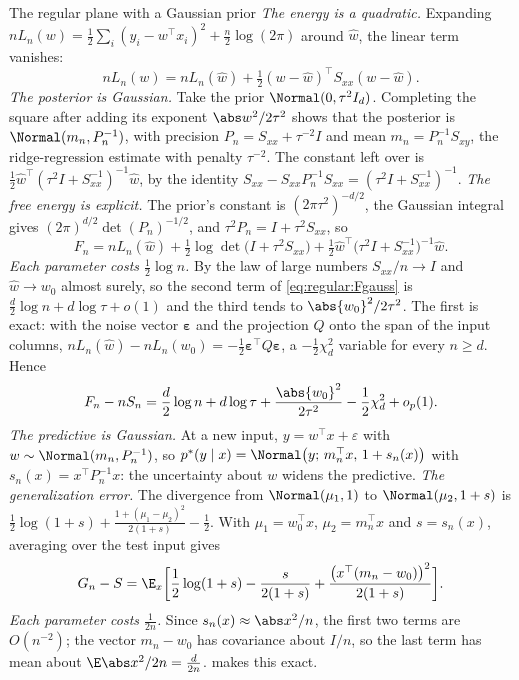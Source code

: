 \begin{refsection}
\begin{computation}{The regular plane with a Gaussian prior}\label{comp:regular:gauss}
\step \emph{The energy is a quadratic.} Expanding $nL_n(w)=\frac12\sum_i(y_i-w^\top x_i)^2+\frac n2\log(2\pi)$ around $\hat w$, the linear term vanishes:
\[
nL_n(w)=nL_n(\hat w)+\tfrac12(w-\hat w)^\top S_{xx}(w-\hat w).
\]
\step \emph{The posterior is Gaussian.} Take the prior $\Normal(0,\tau^2I_d)$. Completing the square after adding its exponent $\abs w^2/2\tau^2$ shows that the posterior is $\Normal(m_n,P_n^{-1})$, with precision $P_n=S_{xx}+\tau^{-2}I$ and mean $m_n=P_n^{-1}S_{xy}$, the ridge-regression estimate with penalty $\tau^{-2}$. The constant left over is $\frac12\hat w^\top(\tau^2I+S_{xx}^{-1})^{-1}\hat w$, by the identity $S_{xx}-S_{xx}P_n^{-1}S_{xx}=(\tau^2I+S_{xx}^{-1})^{-1}$.
\step \emph{The free energy is explicit.} The prior's constant is $(2\pi\tau^2)^{-d/2}$, the Gaussian integral gives $(2\pi)^{d/2}\det(P_n)^{-1/2}$, and $\tau^2P_n=I+\tau^2S_{xx}$, so
\begin{equation}\label{eq:regular:Fgauss}
F_n=nL_n(\hat w)+\tfrac12\log\det\bigl(I+\tau^2S_{xx}\bigr)+\tfrac12\hat w^\top\bigl(\tau^2I+S_{xx}^{-1}\bigr)^{-1}\hat w .
\end{equation}
\step \emph{Each parameter costs $\frac12\log n$.} By the law of large numbers $S_{xx}/n\to I$ and $\hat w\to w_0$ almost surely, so the second term of \eqref{eq:regular:Fgauss} is $\frac d2\log n+d\log\tau+o(1)$ and the third tends to $\abs{w_0}^2/2\tau^2$. The first is exact: with the noise vector $\boldsymbol\varepsilon$ and the projection $Q$ onto the span of the input columns, $nL_n(\hat w)-nL_n(w_0)=-\frac12\boldsymbol\varepsilon^\top Q\boldsymbol\varepsilon$, a $-\frac12\chi^2_d$ variable for every $n\ge d$. Hence
\[
F_n-nS_n=\frac d2\log n+d\log\tau+\frac{\abs{w_0}^2}{2\tau^2}-\frac12\chi^2_d+o_p(1).
\]
\step \emph{The predictive is Gaussian.} At a new input, $y=w^\top x+\varepsilon$ with $w\sim\Normal(m_n,P_n^{-1})$, so $p^*(y\mid x)=\Normal\bigl(y;\,m_n^\top x,\,1+s_n(x)\bigr)$ with $s_n(x)=x^\top P_n^{-1}x$: the uncertainty about $w$ widens the predictive.
\step \emph{The generalization error.} The divergence from $\Normal(\mu_1,1)$ to $\Normal(\mu_2,1+s)$ is $\frac12\log(1+s)+\frac{1+(\mu_1-\mu_2)^2}{2(1+s)}-\frac12$. With $\mu_1=w_0^\top x$, $\mu_2=m_n^\top x$ and $s=s_n(x)$, averaging over the test input gives
\begin{equation}\label{eq:regular:Ggauss}
G_n-S=\E_x\biggl[\frac12\log(1+s)-\frac{s}{2(1+s)}+\frac{\bigl(x^\top(m_n-w_0)\bigr)^2}{2(1+s)}\biggr].
\end{equation}
\step \emph{Each parameter costs $\frac1{2n}$.} Since $s_n(x)\approx\abs x^2/n$, the first two terms are $O(n^{-2})$; the vector $m_n-w_0$ has covariance about $I/n$, so the last term has mean about $\E\abs x^2/2n=\frac d{2n}$.  makes this exact.
\end{computation}


\end{refsection}
